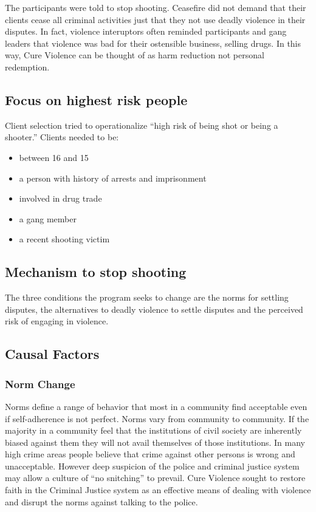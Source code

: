 \documentclass[11pt]{article}
\begin{document}
The participants were told to stop shooting. Ceasefire did not demand that their clients cease
all criminal activities just that they not use deadly violence in their disputes.  In fact, 
violence interuptors often reminded participants and gang leaders that violence was bad for 
their ostensible business, selling drugs.  In this way, Cure Violence can be thought of as
harm reduction not personal redemption.
\subsection{Focus on highest risk people}
\label{sec-1-3}

Client selection tried to operationalize ``high risk of being shot or being a shooter.'' 
Clients needed to be:

\begin{itemize}
\item between 16 and 15
\item a person with history of arrests and imprisonment
\item involved in drug trade
\item a gang member
\item a recent shooting victim
\end{itemize}
\subsection{Mechanism to stop shooting}
\label{sec-1-4}

The three conditions the program seeks to change are the norms for settling disputes, the 
alternatives to deadly violence to settle disputes and the perceived risk of engaging in violence.
\subsection{Causal Factors}
\label{sec-1-5}

\subsubsection{Norm Change}
\label{sec-1-5-1}

Norms define a range of behavior that most in a community find acceptable even if self-adherence is 
not perfect.  Norms vary from community to community.  If the majority in a community feel that the 
institutions of civil society are inherently biased against them they will not avail themselves of 
those institutions.  In many high crime areas people believe that crime against other persons is 
wrong and unacceptable.  However deep suspicion of the police and criminal justice system may allow a
culture of ``no snitching'' to prevail.  Cure Violence sought to restore faith in the Criminal Justice
system as an effective means of dealing with violence and disrupt the norms against talking to the 
police.
\end{document}
